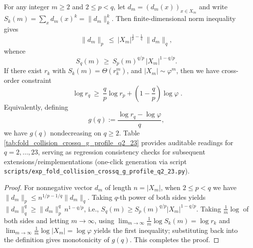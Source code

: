 \begin{proposition}\label{prop:pom-crossq-g-monotone}
For any integer \(m\ge 2\) and \(2\le p<q\), let \(d_m=(d_m(x))_{x\in X_m}\) and write \(S_k(m)=\sum_x d_m(x)^k=\|d_m\|_k^k\).
Then finite-dimensional norm inequality gives
\[
\|d_m\|_p\ \le\ |X_m|^{\frac{1}{p}-\frac{1}{q}}\ \|d_m\|_q,
\]
whence
\[
S_q(m)\ \ge\ S_p(m)^{q/p}\,|X_m|^{1-q/p}.
\]
If there exist \(r_k\) with \(S_k(m)=\Theta(r_k^m)\), and \(|X_m|\sim \varphi^m\), then we have cross-order constraint
\[
\boxed{\;
\log r_q \ \ge\ \frac{q}{p}\log r_p + \left(1-\frac{q}{p}\right)\log\varphi\; }.
\]
Equivalently, defining
\[
g(q):=\frac{\log r_q-\log\varphi}{q},
\]
we have \(g(q)\) nondecreasing on \(q\ge 2\).
Table \ref{tab:fold_collision_crossq_g_profile_q2_23} provides auditable readings for \(q=2,\dots,23\), serving as regression consistency checks for subsequent extensions/reimplementations (one-click generation via script \texttt{scripts/exp\_fold\_collision\_crossq\_g\_profile\_q2\_23.py}).
\end{proposition}
\begin{proof}
For nonnegative vector \(d_m\) of length \(n=|X_m|\), when \(2\le p<q\) we have \(\|d_m\|_p\le n^{1/p-1/q}\|d_m\|_q\).
Taking \(q\)-th power of both sides yields
\(
\|d_m\|_q^q \ge \|d_m\|_p^q\,n^{1-q/p}
\),
i.e.,
\(
S_q(m)\ge S_p(m)^{q/p}|X_m|^{1-q/p}
\).
Taking \(\frac{1}{m}\log\) of both sides and letting \(m\to\infty\), using
\(
\lim_{m\to\infty}\frac{1}{m}\log S_k(m)=\log r_k
\)
and
\(
\lim_{m\to\infty}\frac{1}{m}\log|X_m|=\log\varphi
\)
yields the first inequality; substituting back into the definition gives monotonicity of \(g(q)\). This completes the proof.
\end{proof}



